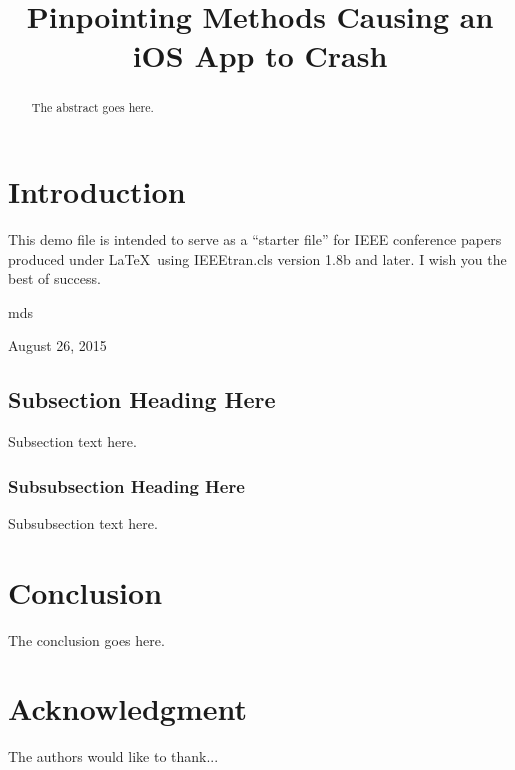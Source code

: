 \documentclass[conference]{IEEEtran}
\begin{document}
\title{Pinpointing Methods Causing an\\ iOS App to Crash}


\author{
}

\maketitle

\begin{abstract}
The abstract goes here.
\end{abstract}

\IEEEpeerreviewmaketitle

\section{Introduction}
This demo file is intended to serve as a ``starter file''
for IEEE conference papers produced under \LaTeX\ using
IEEEtran.cls version 1.8b and later.
I wish you the best of success.

\hfill mds
 
\hfill August 26, 2015

\subsection{Subsection Heading Here}
Subsection text here.


\subsubsection{Subsubsection Heading Here}
Subsubsection text here.



\section{Conclusion}
The conclusion goes here.


\section*{Acknowledgment}

The authors would like to thank...~\cite{deshotels2016sandscout}




\end{document}
